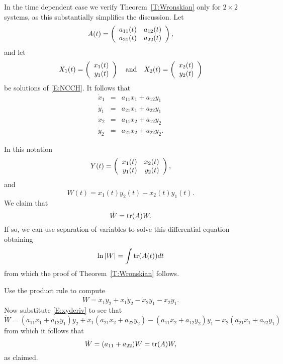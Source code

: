 \documentclass{ximera}
\begin{document}
In the time dependent case we verify Theorem~\ref{T:Wronskian} only 
for $2\times 2$ systems, as this 
substantially simplifies the discussion.   Let 
\[
A(t) = \left(\begin{array}{rr} a_{11}(t) & a_{12}(t)\\ a_{21}(t) &a_{22}(t)\end{array}\right),
\]
and let 
\[
X_1(t) = \left(\begin{array}{r} x_1(t) \\ y_1(t)\end{array}\right) \quad\mbox{and}\quad  X_2(t) = \left(\begin{array}{r} x_2(t) \\ y_2(t)\end{array}\right)
\]
be solutions of \eqref{E:NCCH}.  It follows that 
\begin{equation}   \label{E:xyderiv}
\begin{array}{rcl}
\dot{x}_1 & = & a_{11}x_1 + a_{12}y_1 \\
\dot{y}_1 & = & a_{21}x_1 + a_{22}y_1 \\
\dot{x}_2 & = & a_{11}x_2 + a_{12}y_2 \\
\dot{y}_2 & = & a_{21}x_2 + a_{22}y_2.
\end{array}
\end{equation}

In this notation 
\[
Y(t) = \left(\begin{array}{rr} x_1(t) & x_2(t)\\ y_1(t) &y_2(t)\end{array}\right),
\]
and
\[
W(t) = x_1(t)y_2(t) - x_2(t)y_1(t).
\]
We claim that 
\[
\dot{W} = {\rm tr}(A) W.
\]
If so, we can use separation of variables to solve this differential equation 
obtaining
\[
\ln |W| = \int {\rm tr}(A(t))dt 
\]
from which the proof of Theorem~\ref{T:Wronskian} follows.

Use the product rule to compute
\[
\dot{W}  =  \dot{x}_1y_2 + x_1\dot{y}_2 - \dot{x}_2y_1 - x_2\dot{y}_1.
\]
Now substitute \eqref{E:xyderiv} to see that 
\[
\dot{W} = (a_{11}x_1 + a_{12}y_1)y_2 + x_1(a_{21}x_2 + a_{22}y_2)
- (a_{11}x_2 + a_{12}y_2)y_1 - x_2(a_{21}x_1 + a_{22}y_1)
\]
from which it follows that 
\[
\dot{W} = (a_{11}+a_{22})W = {\rm tr}(A)W,
\]
as claimed.





 
\end{document}
